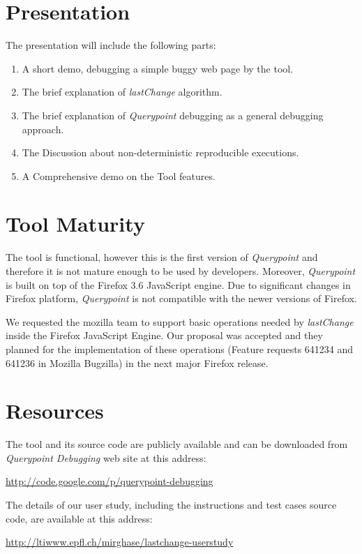 \documentclass{sig-alternate}
\begin{document}
%
%

\appendix
\section{Presentation}
The presentation will include the following parts:
\begin{enumerate}
	\item A short demo, debugging a simple buggy web page by the tool.
	\item The brief explanation of \textit{lastChange} algorithm.
	\item The brief explanation of \textit{Querypoint} debugging as a general debugging approach.
	\item The Discussion about non-deterministic reproducible executions.
	\item A Comprehensive demo on the Tool features.
\end{enumerate}

\section{Tool Maturity}
The tool is functional, however this is the first version of \textit{Querypoint} and therefore it is 
not mature enough to be used by developers. Moreover, \textit{Querypoint} is built on top of the 
Firefox 3.6 JavaScript engine. Due to significant changes in Firefox platform, \textit{Querypoint} is 
not compatible with the newer versions of Firefox. 

We requested the mozilla team to support basic operations needed by \textit{lastChange} inside the 
Firefox JavaScript Engine. Our proposal was accepted and they planned for the implementation of 
these operations (Feature requests 641234 and 641236 in Mozilla Bugzilla) in the next major Firefox release.


\section{Resources}
The tool and its source code are publicly available and can be downloaded 
from \textit{Querypoint Debugging} web site at this address:

\mbox{\href{http://code.google.com/p/querypoint-debugging}{http://code.google.com/p/querypoint-debugging}}

The details of our user study, including the instructions and test cases source code, are available at this address:

\mbox{\href{http://ltiwww.epfl.ch/~mirghase/lastchange-userstudy}{http://ltiwww.epfl.ch/\texttildelow mirghase/lastchange-userstudy}}
\end{document}
